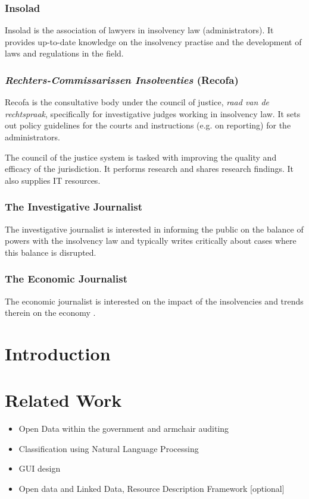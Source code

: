 \subsubsection{Insolad}
Insolad is the association of lawyers in insolvency law (administrators). It provides up-to-date knowledge on the insolvency practise and the development of laws and regulations in the field.

\subsubsection{\textit{Rechters-Commissarissen Insolventies} (Recofa)}
Recofa is the consultative body under the council of justice, \textit{raad van de rechtspraak}, specifically for investigative judges working in insolvency law. It sets out policy guidelines for the courts and instructions (e.g. on reporting) for the administrators.

The council of the justice system is tasked with improving the quality and efficacy of the jurisdiction. It performs research and shares research findings. It also supplies IT resources.

\subsubsection{The Investigative Journalist}
The investigative journalist is interested in informing the public on the balance of powers with the insolvency law and typically writes critically about cases where this balance is disrupted.

\subsubsection{The Economic Journalist}
The economic journalist is interested on the impact of the insolvencies and trends therein on the economy .

\section{Introduction}

\section{Related Work}

\begin{itemize}
	\item Open Data within the government and armchair auditing
	\item Classification using Natural Language Processing
	\item GUI design
	\item Open data and Linked Data, Resource Description Framework [optional]
\end{itemize}

